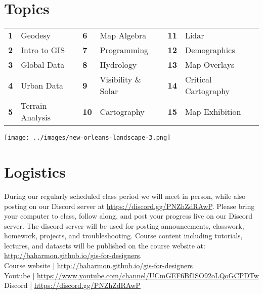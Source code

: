 \documentclass[11pt,article,oneside]{memoir}
\begin{document}
\section{Topics}

\begin{table}[H]
\begin{tabular}{l l @{\hskip 0.5cm} l l @{\hskip 0.5cm} l l}
\small
\textbf{1} & Geodesy & \textbf{6} & Map Algebra & \textbf{11} & Lidar\\
\textbf{2} & Intro to GIS & \textbf{7} & Programming & \textbf{12} & Demographics\\
\textbf{3} & Global Data & \textbf{8} & Hydrology & \textbf{13} & Map Overlays\\
\textbf{4} & Urban Data & \textbf{9} & Visibility \& Solar & \textbf{14} & Critical Cartography\\
\textbf{5} & Terrain Analysis & \textbf{10} & Cartography & \textbf{15} & Map Exhibition\\
\end{tabular}
\end{table}

\vspace*{1em}

\texttt{[image: ../images/new-orleans-landscape-3.png]}

\clearpage

\section{Logistics}

During our regularly scheduled class period
we will meet in person, while also posting
on our Discord server at \url{https://discord.gg/PNZhZdRAwP}. 
Please bring your computer to class, follow along, 
and post your progress live on our Discord server. 
The discord server will be used for posting
announcements, classwork, homework, projects, and troubleshooting. 
Course content including tutorials, lectures, and datasets
will be published on the course website at:
\url{http://baharmon.github.io/gis-for-designers}.\\

\noindent
Course website | \url{http://baharmon.github.io/gis-for-designers}\\
Youtube | \url{https://www.youtube.com/channel/UCmGEF6Bf1SO92oLQoGCPDTw}\\
Discord | \url{https://discord.gg/PNZhZdRAwP}\\
\end{document}
